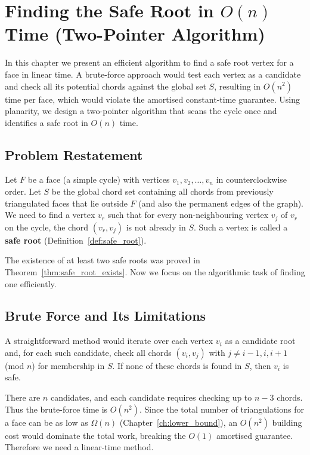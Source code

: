 
\chapter{Finding the Safe Root in \(O(n)\) Time (Two-Pointer Algorithm)}
\label{ch:safe_root_algorithm}

In this chapter we present an efficient algorithm to find a safe root vertex for a face in linear time. 
A brute-force approach would test each vertex as a candidate and check all its potential chords against the global set \(S\), resulting in \(O(n^2)\) time per face, which would violate the amortised constant-time guarantee. 
Using planarity, we design a two-pointer algorithm that scans the cycle once and identifies a safe root in \(O(n)\) time.

\section{Problem Restatement}
\label{sec:safe_root_problem}

Let \(F\) be a face (a simple cycle) with vertices \(v_1, v_2, \dots, v_n\) in counterclockwise order. 
Let \(S\) be the global chord set containing all chords from previously triangulated faces that lie outside \(F\) (and also the permanent edges of the graph). 
We need to find a vertex \(v_r\) such that for every non-neighbouring vertex \(v_j\) of \(v_r\) on the cycle, the chord \((v_r, v_j)\) is not already in \(S\). 
Such a vertex is called a \textbf{safe root} (Definition~\ref{def:safe_root}).

The existence of at least two safe roots was proved in Theorem~\ref{thm:safe_root_exists}. 
Now we focus on the algorithmic task of finding one efficiently.

\section{Brute Force and Its Limitations}
\label{sec:brute_force}

A straightforward method would iterate over each vertex \(v_i\) as a candidate root and, for each such candidate, check all chords \((v_i, v_j)\) with \(j \neq i-1, i, i+1\) (mod \(n\)) for membership in \(S\). 
If none of these chords is found in \(S\), then \(v_i\) is safe.

There are \(n\) candidates, and each candidate requires checking up to \(n-3\) chords. 
Thus the brute-force time is \(O(n^2)\). 
Since the total number of triangulations for a face can be as low as \(\Omega(n)\) (Chapter~\ref{ch:lower_bound}), an \(O(n^2)\) building cost would dominate the total work, breaking the \(O(1)\) amortised guarantee. 
Therefore we need a linear-time method.

